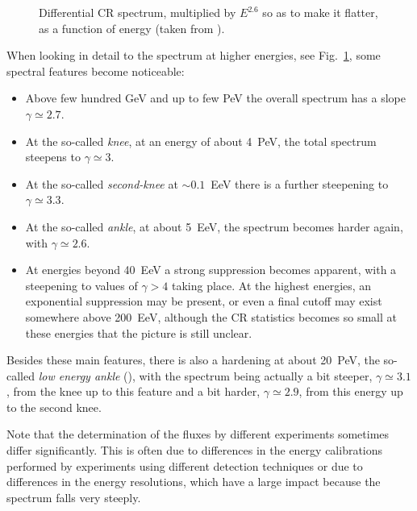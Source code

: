 \documentclass[twoside,12pt]{article}
\begin{document}
\begin{figure}[tb]
\begin{center}
\begin{minipage}[t]{8 cm}
\centerline{}
\end{minipage}
\caption{Differential CR spectrum, multiplied by $E^{2.6}$ so as to make it flatter, as a function of energy (taken from \cite{pdg16}).\label{spectrum.fig}}
\end{center}
\end{figure}

When looking in detail to the spectrum at higher energies, see Fig.~\ref{spectrum.fig}, some spectral features become noticeable:
\begin{itemize}
\item Above few hundred GeV and up to few PeV the overall spectrum has a slope $\gamma\simeq 2.7$. 
\item At the so-called {\em knee}, at an energy of about 4~PeV, the total spectrum steepens to  $\gamma\simeq 3$.
\item At the so-called {\em second-knee} at $\sim 0.1$~EeV there is a further steepening to   $\gamma\simeq 3.3$.
\item At the so-called {\em ankle}, at about 5~EeV, the spectrum becomes harder again, with   $\gamma\simeq 2.6$.
\item At energies beyond 40~EeV a strong suppression becomes apparent, with a steepening to values of  $\gamma> 4$ taking place. At the highest energies, an exponential suppression may be present, or even a final cutoff may exist somewhere above 200~EeV, although the CR statistics becomes so small at these energies  that the picture is still unclear.
\end{itemize}
Besides these main features, there is also a hardening  at about 20~PeV, the so-called {\it low energy ankle} (\cite{leankle}), with the spectrum being actually a bit steeper, $\gamma\simeq 3.1$, from the knee up to this  feature and a bit harder,  $\gamma\simeq 2.9$, from this energy up to the second knee.

Note that the determination of the fluxes by different experiments sometimes differ significantly. This is often due to differences in the energy calibrations performed by experiments using different detection techniques or due to differences in the energy resolutions, which have a large impact because the spectrum falls very steeply.  
\end{document}
